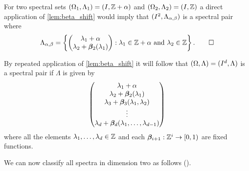 \documentclass[../thesis.tex]{subfiles}
\begin{document}
\begin{example}
    For two spectral sets $(\Omega_1,\Lambda_1)=(I, \mathbb{Z}+\alpha)$ and $(\Omega_2,\Lambda_2)=(I, \mathbb{Z})$ a direct application of \cref{lem:beta_shift} would imply that $(I^2,\Lambda_{\alpha,\beta})$ is a spectral pair where
    \begin{equation*}
        \Lambda_{\alpha,\beta} 
        = \left\{\begin{pmatrix}
            \lambda_1 +\alpha\\
            \lambda_2+\bm{\beta}_2(\lambda_1)
            \end{pmatrix}
        : \lambda_1 \in \mathbb{Z} +\alpha \text{ and } \lambda_2 \in \mathbb{Z}\right\}. \qedhere
    \end{equation*}
\end{example}


\begin{example}
    By repeated application of \cref{lem:beta_shift} it will follow that $(\Omega,\Lambda)= (I^d, \Lambda)$ is a spectral pair if $\Lambda$ is given by %
    \begin{equation*}
        \begin{pmatrix}
            \lambda_1 +\alpha\\
            \lambda_2+\bm{\beta}_2(\lambda_1)\\
            \lambda_3+\bm{\beta}_3(\lambda_1,\lambda_2)\\
            \vdots\\
            \lambda_d+\bm{\beta}_d(\lambda_1,\dots,\lambda_{d-1})\\
        \end{pmatrix}
    \end{equation*}
    where all the elements $\lambda_1, \dots, \lambda_d \in \mathbb{Z}$ and each $\bm{\beta}_{i+1}:\mathbb{Z}^{i} \rightarrow [0,1)$ are fixed functions.
\end{example}

We can now classify all spectra in dimension two as follows (\cite{jorgensenSpectralPairsCartesian2001}). 
\end{document}
